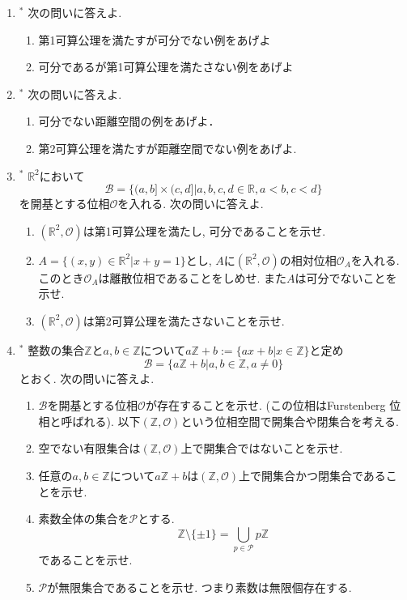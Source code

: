 \documentclass[dvipdfmx,a4paper,11pt]{article}
\newcommand{\R}{\mathbb{R}}
\newcommand{\Z}{\mathbb{Z}}
\theoremstyle{definition}
\begin{document}
\begin{enumerate}[ label=\textbf{問}4.\arabic*]
\item $^{*}$ 次の問いに答えよ.
	\begin{enumerate}
	\item 第1可算公理を満たすが可分でない例をあげよ
	\item 可分であるが第1可算公理を満たさない例をあげよ
	\end{enumerate}
\item  $^{*}$ 次の問いに答えよ.	
	\begin{enumerate}
	\item 可分でない距離空間の例をあげよ．
	\item 第2可算公理を満たすが距離空間でない例をあげよ.
	\end{enumerate}
\item  $^{*}$ $\R^2$において
$$
\mathscr{B} = \{(a,b] \times (c,d]| a,b,c,d \in \R, a<b, c<d\} 
$$
を開基とする位相$\mathscr{O}$を入れる.
次の問いに答えよ. 
	 \begin{enumerate}
	\item $(\R^2,\mathscr{O})$は第1可算公理を満たし, 可分であることを示せ.
	\item $ A=\{ (x,y)\in \R^2 | x+y=1\}$とし, $A$に$(\R^2,\mathscr{O})$の相対位相$\mathscr{O}_A$を入れる. このとき$\mathscr{O}_A$は離散位相であることをしめせ. また$A$は可分でないことを示せ.
	\item $(\R^2,\mathscr{O})$は第2可算公理を満たさないことを示せ.
	\end{enumerate}
\item  $^{*}$ 整数の集合$\Z$と$a,b \in \Z$について$
a\Z + b := \{ ax + b | x \in \Z\}$と定め
$$
\mathscr{B} = \{ a\Z + b | a,b\in \Z, a \neq 0 \} 
$$
とおく. 次の問いに答えよ. 
	\begin{enumerate}
	\item $\mathscr{B}$を開基とする位相$\mathscr{O}$が存在することを示せ. (この位相はFurstenberg 位相と呼ばれる). 以下$(\Z,\mathscr{O} )$という位相空間で開集合や閉集合を考える. 
	\item 空でない有限集合は$(\Z, \mathscr{O})$上で開集合ではないことを示せ. 
	\item 任意の$a,b \in \Z$について$a\Z + b$は$(\Z, \mathscr{O})$上で開集合かつ閉集合であることを示せ.
	\item 素数全体の集合を$\mathcal{P}$とする.
	$$\Z \setminus \{ \pm 1\} = \bigcup_{p \in \mathcal{P}} p\Z$$
	であることを示せ.
	\item $\mathcal{P}$が無限集合であることを示せ. つまり素数は無限個存在する.
	\end{enumerate}



\end{enumerate}
\end{document}
